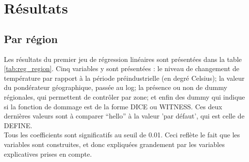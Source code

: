 \section{Résultats}

\subsection{Par région}

\begin{table}
    \centering
     \resizebox{\textwidth}{!}{}
     \label{tab:reg_region}

\end{table}

Les résultats du premier jeu de régression linéaires sont présentées dans la table \ref{tab:reg_region}. Cinq variables y sont présentées : le niveau de changement de température par rapport à la période préindustrielle (en degré Celsius); la valeur du pondérateur géographique, passée au log; la présence ou non de dummy régionales, qui permettent de contrôler par zone; et enfin des dummy qui indique si la fonction de dommage est de la forme DICE ou WITNESS. Ces deux dernières valeurs sont à comparer \enquote{hello} à la valeur 'par défaut', qui est celle de DEFINE. \\






Tous les coefficients sont significatifs au seuil de 0.01. Ceci reflète le fait que les variables sont construites, et donc expliquées grandement par les variables explicatives prises en compte. 


